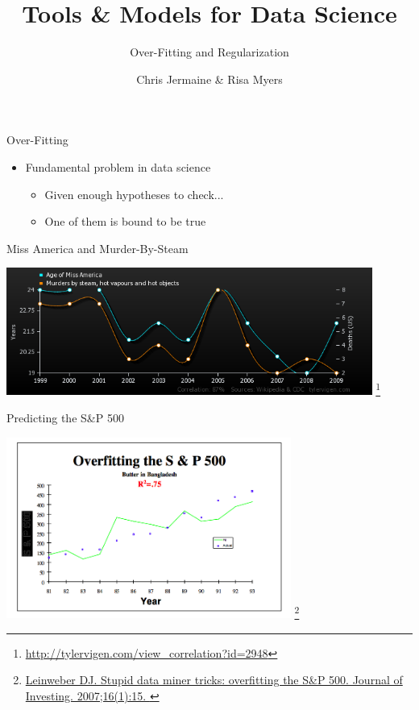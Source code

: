\documentclass[aspectratio=169]{beamer}
\title[]
{Tools \& Models for Data Science}
\subtitle{Over-Fitting and Regularization}
\author[]{Chris Jermaine \& Risa Myers}
\institute
{
  Rice University
}
\date[]{}
\begin{document}
\begin{frame}
 \titlepage
\end{frame}

\begin{frame}{Over-Fitting}

\begin{itemize}
	\item Fundamental problem in data science
        \begin{itemize}
                \item Given enough hypotheses to check...
		\item One of them is bound to be true
        \end{itemize}
\end{itemize}
\end{frame}
\begin{frame}{Miss America and Murder-By-Steam}

\includegraphics[width=0.9\textwidth]{lectReg/age-of-miss-america_murders-by-steam-hot-vapours-and-hot-objects.png}
\footnote{\url{http://tylervigen.com/view_correlation?id=2948}}
\end{frame}

\begin{frame}{Predicting the S\&P 500}

\includegraphics[width=0.7\textwidth]{./lectReg/butter1.png}
\footnote{\url{Leinweber DJ. Stupid data miner tricks: overfitting the S&P 500. Journal of Investing. 2007;16(1):15.
}}
\end{frame}
\end{document}
